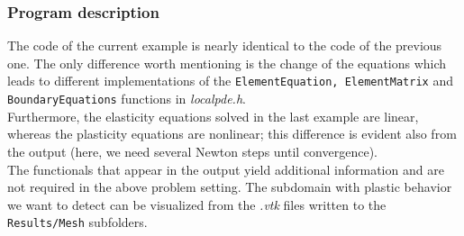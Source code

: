 \subsubsection{Program description}

The code of the current example is nearly identical to the code of the previous one. The only difference worth mentioning is the change of the equations which leads to different implementations of the \texttt{ElementEquation, ElementMatrix} and \texttt{BoundaryEquations} functions in \textit{localpde.h}.\\
Furthermore, the elasticity equations solved in the last example are linear, whereas the plasticity equations are nonlinear; this difference is evident also from the output (here, we need several Newton steps until convergence).\\
The functionals that appear in the output yield additional information and are not required in the above problem setting. The subdomain with plastic behavior we want to detect can be visualized from the \textit{.vtk} files written to the \texttt{Results/Mesh} subfolders.
